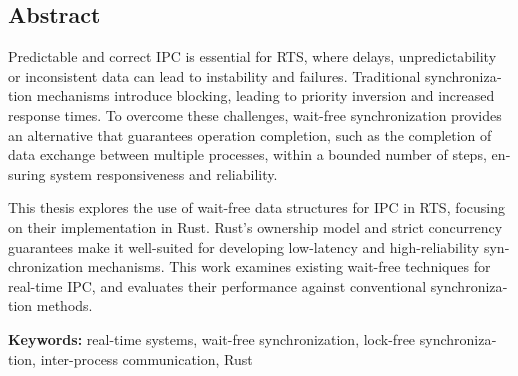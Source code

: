 \begin{otherlanguage}{english}
\chapter*{Abstract}


Predictable and correct \ac{IPC} is essential for \ac{RTS}, where delays, unpredictability or inconsistent data can lead to instability and failures. Traditional synchronization mechanisms introduce blocking, leading to priority inversion and increased response times. To overcome these challenges, wait-free synchronization provides an alternative that guarantees operation completion, such as the completion of data exchange between multiple processes, within a bounded number of steps, ensuring system responsiveness and reliability.

This thesis explores the use of wait-free data structures for \ac{IPC} in \ac{RTS}, focusing on their implementation in Rust. Rust's ownership model and strict concurrency guarantees make it well-suited for developing low-latency and high-reliability synchronization mechanisms. This work examines existing wait-free techniques for real-time \ac{IPC}, and evaluates their performance against conventional synchronization methods.

\vfill
\noindent\textbf{Keywords:} real-time systems, wait-free synchronization, lock-free synchronization, inter-process communication, Rust
\vfill
\end{otherlanguage}